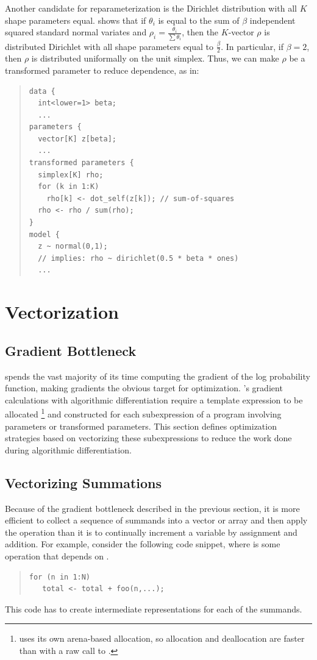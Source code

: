 Another candidate for reparameterization is the Dirichlet distribution
with all $K$ shape parameters equal. \citep{ZyczkowskiSommers:2001} shows 
that if $\theta_i$ is equal to the sum of $\beta$ independent squared 
standard normal variates and $\rho_i = \frac{\theta_i}{\sum \theta_i}$, 
then the $K$-vector $\rho$ is distributed Dirichlet with all shape 
parameters equal to $\frac{\beta}{2}$. In particular, if $\beta = 2$, 
then $\rho$ is distributed uniformally on the unit simplex. Thus, we can 
make $\rho$ be a transformed parameter to reduce dependence, as in:
%
\begin{quote}
\begin{Verbatim}
data {
  int<lower=1> beta;
  ...
parameters {
  vector[K] z[beta];
  ...
transformed parameters {
  simplex[K] rho;
  for (k in 1:K)
    rho[k] <- dot_self(z[k]); // sum-of-squares
  rho <- rho / sum(rho);
}
model {
  z ~ normal(0,1); 
  // implies: rho ~ dirichlet(0.5 * beta * ones)
  ...
\end{Verbatim}
\end{quote}
%
\section{Vectorization}

\subsection{Gradient Bottleneck}

\Stan spends the vast majority of its time computing the gradient of
the log probability function, making gradients the obvious target for
optimization.  \Stan's gradient calculations with algorithmic
differentiation require a template expression to be allocated%
%
\footnote{\Stan uses its own arena-based allocation, so allocation and
  deallocation are faster than with a raw call to .}
%
and constructed for each subexpression of a \Stan program involving
parameters or transformed parameters.  This section defines
optimization strategies based on vectorizing these subexpressions to
reduce the work done during algorithmic differentiation.

\subsection{Vectorizing Summations}

Because of the gradient bottleneck described in the previous section,
it is more efficient to collect a sequence of summands into a vector
or array and then apply the  operation than it is to
continually increment a variable by assignment and addition.  For
example, consider the following code snippet, where  is
some operation that depends on .
%
\begin{quote}
\begin{Verbatim}
for (n in 1:N) 
   total <- total + foo(n,...);
\end{Verbatim}
\end{quote}
%
This code has to create intermediate representations for each
of the  summands.  


